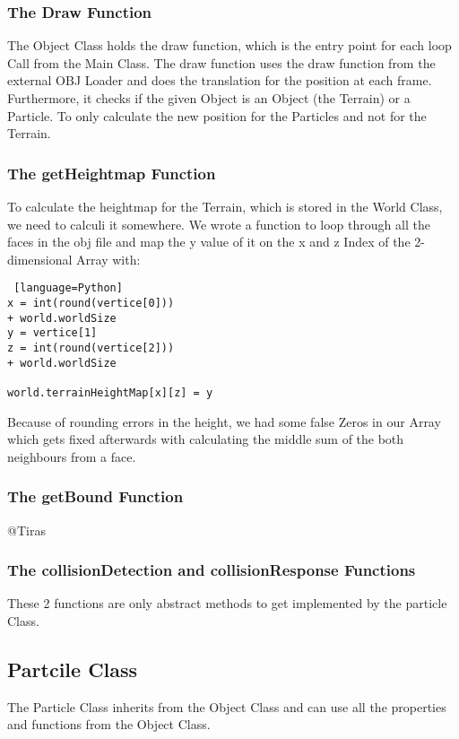 \documentclass{sig-alternate-05-2015}
\begin{document}
\subsubsection{The Draw Function}
The Object Class holds the draw function, which is the entry point for each loop Call from the Main Class. The draw function uses the draw function from the external OBJ Loader and does the translation for the position at each frame. Furthermore, it checks if the given Object is an Object (the Terrain) or a Particle. To only calculate the new position for the Particles and not for the Terrain.  \\
\subsubsection{The getHeightmap Function}
To calculate the heightmap for the Terrain, which is stored in the World Class, we need to calculi it somewhere. We wrote a function to loop through all the faces in the obj file and map the y value of it on the x and z Index of the 2-dimensional Array with:\\
\begin{lstlisting} [language=Python]
x = int(round(vertice[0])) 
+ world.worldSize
y = vertice[1]
z = int(round(vertice[2])) 
+ world.worldSize

world.terrainHeightMap[x][z] = y

\end{lstlisting}
Because of rounding errors in the height, we had some false Zeros in our Array which gets fixed afterwards with calculating the middle sum of the both neighbours from a face.\\
\subsubsection{The getBound Function}
@Tiras
\subsubsection{The collisionDetection and collisionResponse Functions}
These 2 functions are only abstract methods to get implemented by the particle Class.\\
\subsection{Partcile Class}
The Particle Class inherits from the Object Class and can use all the properties and functions from the Object Class.
\end{document}
